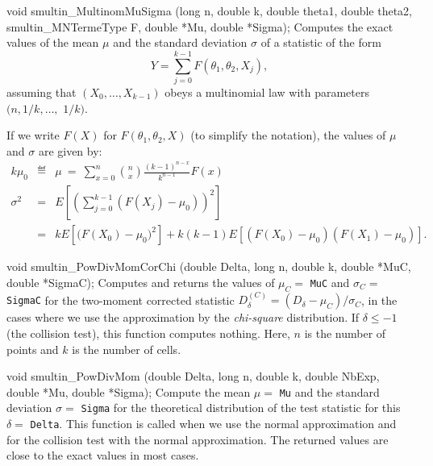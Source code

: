 void smultin_MultinomMuSigma (long n, double k, double theta1,
                              double theta2, smultin_MNTermeType F,
                              double *Mu, double *Sigma);
\endcode
 \tab
  Computes the exact values of the mean $\mu$ and the standard deviation
  $\sigma$ of a statistic of the form
  $$
    Y = \sum_{j=0}^{k-1} F(\theta_1, \theta_2, X_j),
  $$
  assuming that $(X_0,\ldots, X_{k-1})$
  obeys a multinomial law with parameters $(n, 1/k, \ldots,$ $1/k)$.

  If we write $F(X)$ for $F(\theta_1,\theta_2, X)$ (to simplify the notation),
  the values of $\mu$ and $\sigma$ are given by:
  \begin{eqnarray}
    k\mu_0 & \eqdef & \mu\ = \ \sum_{x=0}^n {n \choose x}
      \frac{(k-1)^{n-x}}{k^{n-1}} F(x) \label{eq:smultin-mu}  \\
   \sigma^2 &=& E\left[\left(\sum_{j=0}^{k-1}\left(F(X_j) - \mu_0 \right)
     \right)^2 \right]\\[6pt]
     &=& k E\left[\Big(F(X_0) - \mu_0 \Big)^2 \right] + k(k-1)
    E\left[\left(F(X_0) - \mu_0 \right) \left(F(X_1) - \mu_0 \right) \right].
                                              \label{eq:smultin-sigma2}
  \end{eqnarray}
\iffalse %
  We meet such multinomial  vectors in the following context:
  We throw $n$ balls into $k$ cells, independently and with a
  uniform probability $1/k$ for each cell, and we define
  $X_j$ as the number of balls falling into  cell $j$.
\fi  %
 \endtab
\code

void smultin_PowDivMomCorChi (double Delta, long n, double k,
                              double *MuC, double *SigmaC);
\endcode
 \tab
  Computes and returns the values of $\mu_C = $ {\tt MuC} and
  $\sigma_C = $ {\tt SigmaC} for the two-moment corrected statistic
  $D_\delta^{(C)} = (D_\delta - \mu_C) / \sigma_C$,
  in the cases where we use the approximation by the {\em chi-square\/}
  distribution.
  If $\delta \le -1$ (the collision test), this function computes nothing.
  Here, $n$ is the number of points and $k$ is the number of cells.
 \endtab
\code


void smultin_PowDivMom (double Delta, long n, double k,
                        double NbExp, double *Mu, double *Sigma);
\endcode
 \tab
  Compute the mean $\mu = $ {\tt Mu} and the standard deviation $\sigma = $
  {\tt Sigma} for the  theoretical distribution of the test statistic  for
  this  $\delta = $ {\tt Delta}.  This  function is called when we use the
  normal approximation and for the collision test with the normal
  approximation.
  The returned  values are close to the exact values in most cases.
 \endtab

